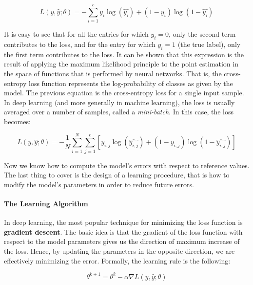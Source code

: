 \documentclass[../main.tex]{subfiles}
\begin{document}
    \begin{equation}
        L(y, \hat{y}; \theta) = - \sum_{i = 1}^{c} y_{i} \log(\hat{y_{i}}) + (1 - y_{i})\log(1 - \hat{y_{i}})
    \end{equation}

    It is easy to see that for all the entries for which $y_{i} = 0$, only the second term contributes to the loss, and for the entry
    for which $y_{i} = 1$ (the true label), only the first term contributes to the loss. It can be shown that this expression is the result
    of applying the maximum likelihood principle to the point estimation in the space of functions that is performed by neural networks. That is,
    the cross-entropy loss function represents the log-probability of classes as given by the model.
    The previous equation is the cross-entropy loss for a single input sample. In deep learning (and more generally in machine learning),
    the loss is usually averaged over a number of samples, called a \textit{mini-batch}. In this case, the loss becomes:

    \begin{equation}
        L(y, \hat{y}; \theta) = - \frac{1}{N} \sum_{i = 1}^{N} \sum_{j = 1}^{c} \left[ y_{i, j} \log(\hat{y_{i, j}}) + (1 - y_{i, j})\log(1 - \hat{y_{i, j}})  \right]
    \end{equation}

    Now we know how to compute the model's errors with respect to reference values. The last thing to cover is the design of a learning
    procedure, that is how to modify the model's parameters in order to reduce future errors.

    \paragraph{The Learning Algorithm}
    In deep learning, the most popular technique for minimizing the loss function is \textbf{gradient descent}. The basic idea
    is that the gradient of the loss function with respect to the model parameters gives us the direction of maximum increase
    of the loss. Hence, by updating the parameters in the opposite direction, we are effectively minimizing the error.
    Formally, the learning rule is the following:

    \begin{equation}\label{eq:gradientdescent}
        \theta^{k+1} = \theta^{k} - \alpha \nabla L(y, \hat{y}; \theta)
    \end{equation}
\end{document}
